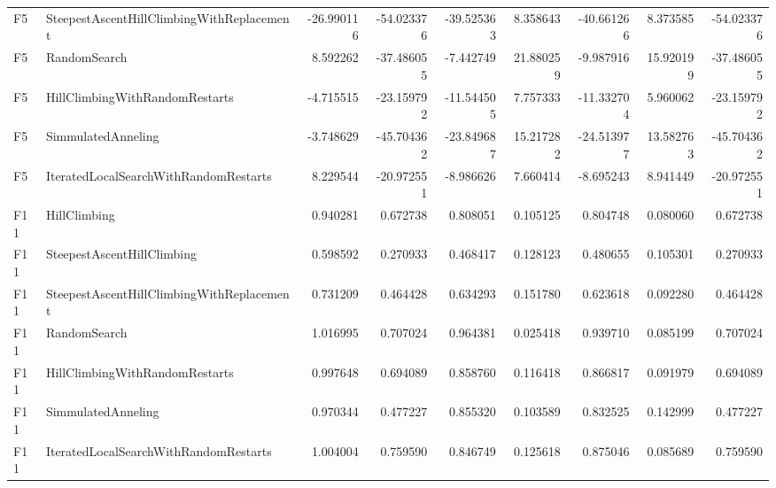 \begin{tabular}{llrrrrrrr}
F5 & SteepestAscentHillClimbingWithReplacement & -26.990116 & -54.023376 & -39.525363 & 8.358643 & -40.661266 & 8.373585 & -54.023376 \\
F5 & RandomSearch & 8.592262 & -37.486055 & -7.442749 & 21.880259 & -9.987916 & 15.920199 & -37.486055 \\
F5 & HillClimbingWithRandomRestarts & -4.715515 & -23.159792 & -11.544505 & 7.757333 & -11.332704 & 5.960062 & -23.159792 \\
F5 & SimmulatedAnneling & -3.748629 & -45.704362 & -23.849687 & 15.217282 & -24.513977 & 13.582763 & -45.704362 \\
F5 & IteratedLocalSearchWithRandomRestarts & 8.229544 & -20.972551 & -8.986626 & 7.660414 & -8.695243 & 8.941449 & -20.972551 \\
F11 & HillClimbing & 0.940281 & 0.672738 & 0.808051 & 0.105125 & 0.804748 & 0.080060 & 0.672738 \\
F11 & SteepestAscentHillClimbing & 0.598592 & 0.270933 & 0.468417 & 0.128123 & 0.480655 & 0.105301 & 0.270933 \\
F11 & SteepestAscentHillClimbingWithReplacement & 0.731209 & 0.464428 & 0.634293 & 0.151780 & 0.623618 & 0.092280 & 0.464428 \\
F11 & RandomSearch & 1.016995 & 0.707024 & 0.964381 & 0.025418 & 0.939710 & 0.085199 & 0.707024 \\
F11 & HillClimbingWithRandomRestarts & 0.997648 & 0.694089 & 0.858760 & 0.116418 & 0.866817 & 0.091979 & 0.694089 \\
F11 & SimmulatedAnneling & 0.970344 & 0.477227 & 0.855320 & 0.103589 & 0.832525 & 0.142999 & 0.477227 \\
F11 & IteratedLocalSearchWithRandomRestarts & 1.004004 & 0.759590 & 0.846749 & 0.125618 & 0.875046 & 0.085689 & 0.759590 \\
\bottomrule
\end{tabular}

